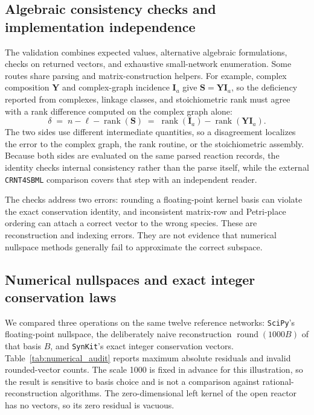 \documentclass[pdflatex,referee]{../template/sn-jnl}
\theoremstyle{plain}%
\theoremstyle{definition}%
\theoremstyle{remark}%
\newcommand{\synkit}{\texttt{SynKit}\xspace}
\begin{document}
\subsection{Algebraic consistency checks and implementation independence}

The validation combines expected values, alternative algebraic formulations, checks on returned vectors, and exhaustive small-network enumeration. Some routes share parsing and matrix-construction helpers. For example, complex composition $\mathbf Y$ and complex-graph incidence $\mathbf I_a$ give $\mathbf S=\mathbf Y\mathbf I_a$, so the deficiency reported from complexes, linkage classes, and stoichiometric rank must agree with a rank difference computed on the complex graph alone:
\begin{equation}
\label{eq:deficiency_crosscheck}
\delta \;=\; n-\ell-\operatorname{rank}(\mathbf S)
\;=\; \operatorname{rank}(\mathbf I_a)-\operatorname{rank}(\mathbf Y\mathbf I_a).
\end{equation}
The two sides use different intermediate quantities, so a disagreement localizes the error to the complex graph, the rank routine, or the stoichiometric assembly. Because both sides are evaluated on the same parsed reaction records, the identity checks internal consistency rather than the parse itself, while the external \texttt{CRNT4SBML} comparison covers that step with an independent reader.

The checks address two errors: rounding a floating-point kernel basis can violate the exact conservation identity, and inconsistent matrix-row and Petri-place ordering can attach a correct vector to the wrong species. These are reconstruction and indexing errors. They are not evidence that numerical nullspace methods generally fail to approximate the correct subspace.


\subsection{Numerical nullspaces and exact integer conservation laws}
\label{si:numerical}

We compared three operations on the same twelve reference networks: \texttt{SciPy}'s floating-point nullspace, the deliberately naive reconstruction $\operatorname{round}(1000B)$ of that basis $B$, and \synkit's exact integer conservation vectors. Table~\ref{tab:numerical_audit} reports maximum absolute residuals and invalid rounded-vector counts. The scale 1000 is fixed in advance for this illustration, so the result is sensitive to basis choice and is not a comparison against rational-reconstruction algorithms. The zero-dimensional left kernel of the open reactor has no vectors, so its zero residual is vacuous.
\end{document}

